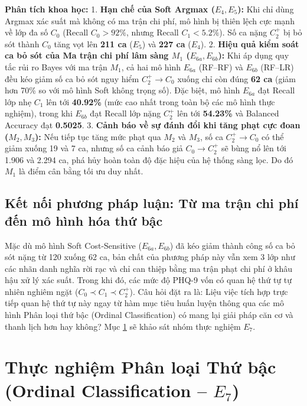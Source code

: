 \textbf{Phân tích khoa học:}
1. \textbf{Hạn chế của Soft Argmax ($E_4, E_5$):} Khi chỉ dùng Argmax xác suất mà không có ma trận chi phí, mô hình bị thiên lệch cực mạnh về lớp đa số $C_0$ (Recall $C_0 > 92\%$, nhưng Recall $C_1 < 5.2\%$). Số ca nặng $C_2^+$ bị bỏ sót thành $C_0$ tăng vọt lên \textbf{211 ca} ($E_5$) và \textbf{227 ca} ($E_4$).  
2. \textbf{Hiệu quả kiểm soát ca bỏ sót của Ma trận chi phí lâm sàng $M_1$ ($E_{6a}, E_{6b}$):} Khi áp dụng quy tắc rủi ro Bayes với ma trận $M_1$, cả hai mô hình $E_{6a}$ (RF--RF) và $E_{6b}$ (RF--LR) đều kéo giảm số ca bỏ sót nguy hiểm $C_2^+ \to C_0$ xuống chỉ còn đúng \textbf{62 ca} (giảm hơn 70\% so với mô hình Soft không trọng số). Đặc biệt, mô hình $E_{6a}$ đạt Recall lớp nhẹ $C_1$ lên tới \textbf{40.92\%} (mức cao nhất trong toàn bộ các mô hình thực nghiệm), trong khi $E_{6b}$ đạt Recall lớp nặng $C_2^+$ lên tới \textbf{54.23\%} và Balanced Accuracy đạt \textbf{0.5025}.
3. \textbf{Cảnh báo về sự đánh đổi khi tăng phạt cực đoan ($M_2, M_3$):} Nếu tiếp tục tăng mức phạt qua $M_2$ và $M_3$, số ca $C_2^+ \to C_0$ có thể giảm xuống 19 và 7 ca, nhưng số ca cảnh báo giả $C_0 \to C_2^+$ sẽ bùng nổ lên tới 1.906 và 2.294 ca, phá hủy hoàn toàn độ đặc hiệu của hệ thống sàng lọc. Do đó $M_1$ là điểm cân bằng tối ưu duy nhất.

\subsection{Kết nối phương pháp luận: Từ ma trận chi phí đến mô hình hóa thứ bậc}
Mặc dù mô hình Soft Cost-Sensitive ($E_{6a}, E_{6b}$) đã kéo giảm thành công số ca bỏ sót nặng từ 120 xuống 62 ca, bản chất của phương pháp này vẫn xem 3 lớp như các nhãn danh nghĩa rời rạc và chỉ can thiệp bằng ma trận phạt chi phí ở khâu hậu xử lý xác suất. Trong khi đó, các mức độ PHQ-9 vốn có quan hệ thứ tự tự nhiên nghiêm ngặt ($C_0 \prec C_1 \prec C_2^+$). Câu hỏi đặt ra là: Liệu việc tích hợp trực tiếp quan hệ thứ tự này ngay từ hàm mục tiêu huấn luyện thông qua các mô hình Phân loại thứ bậc (Ordinal Classification) có mang lại giải pháp căn cơ và thanh lịch hơn hay không? Mục \ref{sec:thuc-nghiem-ordinal} sẽ khảo sát nhóm thực nghiệm $E_7$.

\FloatBarrier
\section{Thực nghiệm Phân loại Thứ bậc (Ordinal Classification -- $E_7$)}
\label{sec:thuc-nghiem-ordinal}

